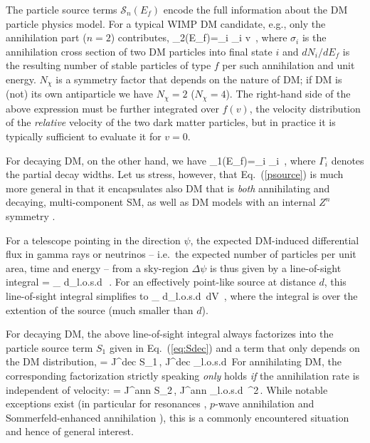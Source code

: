 The particle source terms $\mathcal{S}_n(E_f)$ encode the full information about 
the DM particle physics model. For a typical WIMP DM candidate, e.g., only the annihilation part ($n=2$)
contributes,
\be
 _2(E_f)=\sum_i \sigma_i v  \,,
 \label{eq:Sann}
\ee
where $\sigma_i$ is the annihilation cross section of two DM particles into final state $i$ and 
$dN_i/dE_f$ is the resulting number of stable particles of type $f$ per such 
annihilation and unit energy. $N_\chi$ is a symmetry factor that depends on the nature of DM; if 
DM is (not) its own antiparticle we have $N_\chi=2$ ($N_\chi=4$). 
The right-hand side of the above expression must be further integrated over $f(v)$, the velocity distribution of 
the \emph{relative} velocity of the two dark matter particles, but in practice it is typically sufficient to evaluate it 
for $v=0$.

For decaying DM, on the other hand, we have
\be
 _1(E_f)=\sum_i \Gamma_i  \,,
 \label{eq:Sdec}
\ee
where $\Gamma_i$ denotes the partial decay widths. Let us stress, however, that 
Eq.~(\ref{psource}) is much more general in that it encapsulates also DM that is {\it both} 
annihilating and decaying, multi-component SM, as well as DM models with an internal $Z^n$ 
symmetry \cite{Belanger:2012zr,Belanger:2014bga,Ko:2014nha,Choi:2015bya}. 


For a telescope pointing in the direction $\psi$, the expected DM-induced differential flux in gamma 
rays or neutrinos -- i.e.~the expected number of particles per unit area, time and energy -- from a 
sky-region $\Delta \psi$  is thus given by a line-of-sight integral
\be
 = \int_{\Delta\psi} d\Omega \int_{\rm l.o.s.}\!\!\!\!d\ell\, \,.
\ee
For an effectively point-like source at distance $d$, this line-of-sight integral simplifies to
\be
\int_{\Delta\psi} d\Omega \int_{\rm l.o.s.}\!\!\!\!d\ell\, 
\longrightarrow {} \int dV \,,
\ee
where the integral is over the extention of the source (much smaller
than $d$).

For decaying DM, the above line-of-sight integral always factorizes into the particle source term
$S_1$ given in Eq.~(\ref{eq:Sdec}) and a term that only depends on the DM distribution,
\be
\label{eq:phiann}
= J^{\rm dec} S_1\,, \qquad J^{\rm dec} \equiv \int_{\rm l.o.s.}\!\!\!\!d\ell\, \rho
\ee
For annihilating DM, the corresponding factorization strictly speaking  {\it only} holds {\it if} the annihilation rate is independent of velocity:
\be
\label{eq:phidec}
= J^{\rm ann} S_2\,, \qquad J^{\rm ann} \equiv \int_{\rm l.o.s.}\!\!\!\!d\ell\, \rho^2\,.
\ee
While notable exceptions exist (in particular for resonances \cite{Arina:2014fna}, $p$-wave annihilation \cite{xxx} and  
Sommerfeld-enhanced annihilation \cite{xxx}), this is a commonly encountered situation and hence of general interest.

